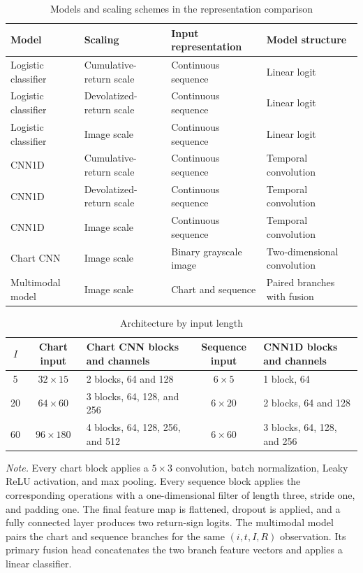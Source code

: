 \begin{table}[htbp]
\centering
\caption{Models and scaling schemes in the representation comparison}
\label{tab:app_model_map}
\small
\renewcommand{\arraystretch}{1.06}
\begin{tabularx}{\textwidth}{@{}>{\raggedright\arraybackslash}p{}>{\raggedright\arraybackslash}p{}>{\raggedright\arraybackslash}p{}L@{}}
\toprule
Model & Scaling & Input representation & Model structure \\
\midrule
Logistic classifier & Cumulative-return scale & Continuous sequence & Linear logit \\
Logistic classifier & Devolatized-return scale & Continuous sequence & Linear logit \\
Logistic classifier & Image scale & Continuous sequence & Linear logit \\
CNN1D & Cumulative-return scale & Continuous sequence & Temporal convolution \\
CNN1D & Devolatized-return scale & Continuous sequence & Temporal convolution \\
CNN1D & Image scale & Continuous sequence & Temporal convolution \\
Chart CNN & Image scale & Binary grayscale image & Two-dimensional convolution \\
Multimodal model & Image scale & Chart and sequence & Paired branches with fusion \\
\bottomrule
\end{tabularx}
\end{table}

\begin{table}[htbp]
\centering
\caption{Architecture by input length}
\label{tab:app_architecture}
\small
\setlength{\tabcolsep}{5pt}
\begin{tabular}{@{}cclcl@{}}
\toprule
$I$ & Chart input & Chart CNN blocks and channels & Sequence input & CNN1D blocks and channels \\
\midrule
5  & $32\times15$  & 2 blocks, 64 and 128 & $6\times5$  & 1 block, 64 \\
20 & $64\times60$  & 3 blocks, 64, 128, and 256 & $6\times20$ & 2 blocks, 64 and 128 \\
60 & $96\times180$ & 4 blocks, 64, 128, 256, and 512 & $6\times60$ & 3 blocks, 64, 128, and 256 \\
\bottomrule
\end{tabular}
\begin{minipage}{\textwidth}
\footnotesize\textit{Note.} Every chart block applies a $5\times3$ convolution, batch normalization, Leaky ReLU activation, and max pooling. Every sequence block applies the corresponding operations with a one-dimensional filter of length three, stride one, and padding one. The final feature map is flattened, dropout is applied, and a fully connected layer produces two return-sign logits. The multimodal model pairs the chart and sequence branches for the same $(i,t,I,R)$ observation. Its primary fusion head concatenates the two branch feature vectors and applies a linear classifier.
\end{minipage}
\end{table}

